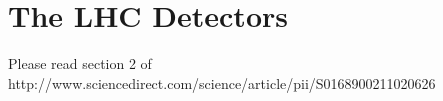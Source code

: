 
\section{The LHC Detectors}

Please read section 2 of http://www.sciencedirect.com/science/article/pii/S0168900211020626



